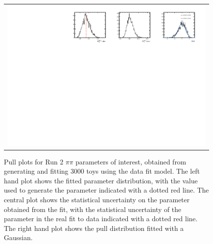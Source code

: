 \begin{figure}
\begin{tabular}{c}
\includegraphics[width=\textwidth]{ANA_resources/Plots/Data_fit/FitterBias//R_ds_pipi_run2.pdf} \\
  \end{tabular}
  \caption{Pull plots for Run 2 $\pi\pi$ parameters of interest, obtained from generating and fitting 3000 toys using the data fit model. The left hand plot shows the fitted parameter distribution, with the value used to generate the parameter indicated with a dotted red line. The central plot shows the statistical uncertainty on the parameter obtained from the fit, with the statistical uncertainty of the parameter in the real fit to data indicated with a dotted red line. The right hand plot shows the pull distribution fitted with a Gaussian.}
\label{fig:pipi_run2_pulls}
\end{figure}
